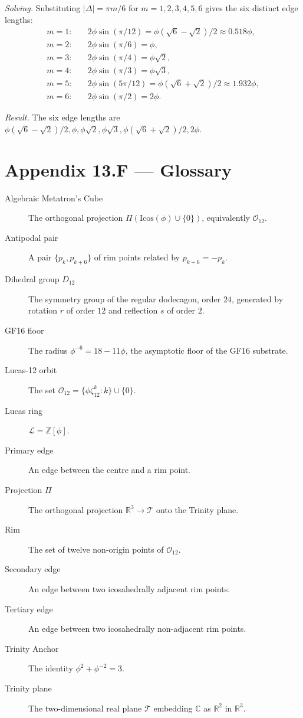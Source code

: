 \emph{Solving.} Substituting $|\Delta| = \pi m/6$ for $m =
1, 2, 3, 4, 5, 6$ gives the six distinct edge lengths:
\begin{align}
  m = 1: & \quad 2\phi \sin(\pi/12) = \phi(\sqrt{6}-\sqrt{2})/2 \approx 0.518\phi,\\
  m = 2: & \quad 2\phi \sin(\pi/6) = \phi,\\
  m = 3: & \quad 2\phi \sin(\pi/4) = \phi\sqrt{2},\\
  m = 4: & \quad 2\phi \sin(\pi/3) = \phi\sqrt{3},\\
  m = 5: & \quad 2\phi \sin(5\pi/12) = \phi(\sqrt{6}+\sqrt{2})/2 \approx 1.932\phi,\\
  m = 6: & \quad 2\phi \sin(\pi/2) = 2\phi.
\end{align}

\emph{Result.} The six edge lengths are
$\phi(\sqrt{6}-\sqrt{2})/2, \phi, \phi\sqrt{2}, \phi\sqrt{3},
\phi(\sqrt{6}+\sqrt{2})/2, 2\phi$.

\section*{Appendix 13.F --- Glossary}
\label{sec:13-appF}

\begin{description}
\item[Algebraic Metatron's Cube] The orthogonal projection
  $\Pi(\mathrm{Icos}(\phi) \cup \{0\})$, equivalently
  $\mathcal{O}_{12}$.
\item[Antipodal pair] A pair $\{p_{k}, p_{k+6}\}$ of rim points
  related by $p_{k+6} = -p_{k}$.
\item[Dihedral group $D_{12}$] The symmetry group of the regular
  dodecagon, order $24$, generated by rotation $r$ of order $12$
  and reflection $s$ of order $2$.
\item[GF16 floor] The radius $\phi^{-6} = 18 - 11\phi$, the
  asymptotic floor of the GF16 substrate.
\item[Lucas-12 orbit] The set $\mathcal{O}_{12} = \{\phi
  \zeta_{12}^{k} : k\} \cup \{0\}$.
\item[Lucas ring] $\mathcal{L} = \mathbb{Z}[\phi]$.
\item[Primary edge] An edge between the centre and a rim point.
\item[Projection $\Pi$] The orthogonal projection
  $\mathbb{R}^{3} \to \mathcal{T}$ onto the Trinity plane.
\item[Rim] The set of twelve non-origin points of $\mathcal{O}_{12}$.
\item[Secondary edge] An edge between two icosahedrally adjacent
  rim points.
\item[Tertiary edge] An edge between two icosahedrally
  non-adjacent rim points.
\item[Trinity Anchor] The identity $\phi^{2} + \phi^{-2} = 3$.
\item[Trinity plane] The two-dimensional real plane $\mathcal{T}$
  embedding $\mathbb{C}$ as $\mathbb{R}^{2}$ in $\mathbb{R}^{3}$.
\end{description}

